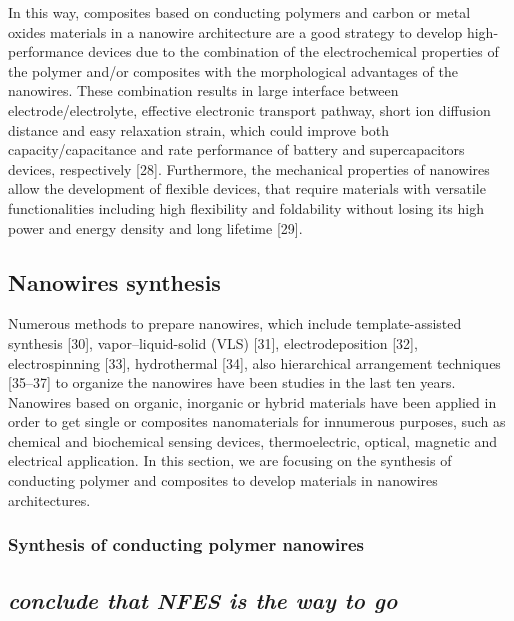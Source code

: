 In this way, composites based on conducting polymers and carbon or metal oxides materials in a nanowire architecture are a good strategy to develop high-performance devices due to the combination of the electrochemical properties of the polymer and/or composites with the morphological advantages of the nanowires. These combination results in large interface between electrode/electrolyte, effective electronic transport pathway, short ion diffusion distance and easy relaxation strain, which could improve both capacity/capacitance and rate performance of battery and supercapacitors devices, respectively [28]. Furthermore, the mechanical properties of nanowires allow the development of flexible devices, that require materials with versatile functionalities including high flexibility and foldability without losing its high power and energy density and long lifetime [29].

\subsection{Nanowires synthesis}

Numerous methods to prepare nanowires, which include template-assisted synthesis [30], vapor–liquid-solid (VLS) [31], electrodeposition [32], electrospinning [33], hydrothermal [34], also hierarchical arrangement techniques [35–37] to organize the nanowires have been studies in the last ten years. Nanowires based on organic, inorganic or hybrid materials have been applied in order to get single or composites nanomaterials for innumerous purposes, such as chemical and biochemical sensing devices, thermoelectric, optical, magnetic and electrical application. In this section, we are focusing on the synthesis of conducting polymer and composites to develop materials in nanowires architectures.

\subsubsection{Synthesis of conducting polymer nanowires}



\subsection{\emph{conclude that NFES is the way to go}}




